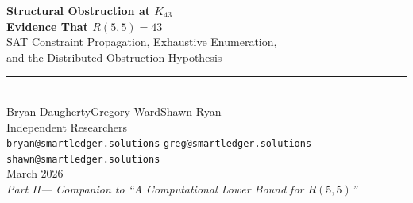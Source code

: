 \documentclass[11pt,a4paper]{article}
\theoremstyle{plain}
\theoremstyle{remark}
\begin{document}
\thispagestyle{empty}


\vspace*{0.5cm}

\begin{center}
  {\fontsize{22}{26}\selectfont\bfseries\color{accent}
   Structural Obstruction at $K_{43}$}\\[6pt]
  {\fontsize{16}{20}\selectfont\bfseries\color{accent}
   Evidence That $R(5,5) = 43$}\\[14pt]
  {\large\color{accentlight}
   SAT Constraint Propagation, Exhaustive Enumeration,\\
   and the Distributed Obstruction Hypothesis}\\[20pt]
  {\color{titlegold}\rule{6cm}{0.8pt}}\\[20pt]
  {\Large Bryan Daugherty\qquad Gregory Ward\qquad Shawn Ryan}\\[8pt]
  {\small\color{subtlegray}
    Independent Researchers\\[2pt]
    \texttt{bryan@smartledger.solutions}\quad
    \texttt{greg@smartledger.solutions}\quad
    \texttt{shawn@smartledger.solutions}}\\[16pt]
  {\normalsize\color{subtlegray} March 2026}\\[6pt]
  {\small\color{subtlegray}\itshape Part II\enspace---\enspace
    Companion to ``A Computational Lower Bound for $R(5,5)$''}
\end{center}

\vspace{14pt}

\noindent
{}

\vspace{10pt}
\end{document}
